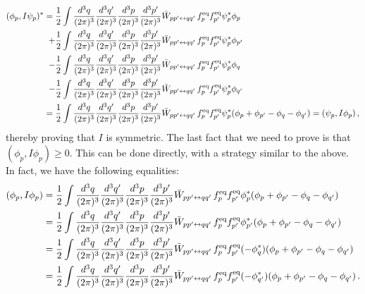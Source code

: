 \documentclass[a4paper, amsfonts, amssymb, amsmath, reprint, showkeys, nofootinbib, twoside, onecolumn,notitlepage]{revtex4-2}
\theoremstyle{definition}
\theoremstyle{theorem}
\theoremstyle{corollary}
\begin{document}
\begin{equation}\label{laquarta2}
\begin{split}
(\phi_p,I\psi_p)^*
= {}& \dfrac{1}{2} \int \dfrac{d^3 q}{(2\pi)^3} \dfrac{d^3 q'}{(2\pi)^3} \dfrac{d^3 p}{(2\pi)^3}\dfrac{d^3 p'}{(2\pi)^3}  \Bar{W}_{pp'\leftrightarrow qq'} \,  f^{\text{eq}}_{p} f^{\text{eq}}_{p'} \psi_p^* \phi_p \\
+{}& \dfrac{1}{2} \int \dfrac{d^3 q}{(2\pi)^3} \dfrac{d^3 q'}{(2\pi)^3} \dfrac{d^3 p}{(2\pi)^3}\dfrac{d^3 p'}{(2\pi)^3}  \Bar{W}_{pp'\leftrightarrow qq'} \,  f^{\text{eq}}_{p} f^{\text{eq}}_{p'} \psi_p^* \phi_{p'} \\
-{}&\dfrac{1}{2} \int \dfrac{d^3 q}{(2\pi)^3} \dfrac{d^3 q'}{(2\pi)^3} \dfrac{d^3 p}{(2\pi)^3}\dfrac{d^3 p'}{(2\pi)^3}  \Bar{W}_{pp'\leftrightarrow qq'} \,  f^{\text{eq}}_{p} f^{\text{eq}}_{p'} \psi_p^* \phi_q \\
-{}& \dfrac{1}{2} \int \dfrac{d^3 q}{(2\pi)^3} \dfrac{d^3 q'}{(2\pi)^3} \dfrac{d^3 p}{(2\pi)^3}\dfrac{d^3 p'}{(2\pi)^3}  \Bar{W}_{pp'\leftrightarrow qq'} \,  f^{\text{eq}}_{p} f^{\text{eq}}_{p'} \psi_p^* \phi_{q'}  \\
= {}& \dfrac{1}{2} \int \dfrac{d^3 q}{(2\pi)^3} \dfrac{d^3 q'}{(2\pi)^3} \dfrac{d^3 p}{(2\pi)^3}\dfrac{d^3 p'}{(2\pi)^3}  \Bar{W}_{pp'\leftrightarrow qq'} \,  f^{\text{eq}}_{p} f^{\text{eq}}_{p'} \psi_p^* (\phi_p+\phi_{p'}-\phi_q-\phi_{q'})=(\psi_p,I\phi_p) \, , \\
\end{split}
\end{equation}
thereby proving that $I$ is symmetric.
The last fact that we need to prove is that $(\phi_p,I\phi_p)\geq 0$. This can be done directly, with a strategy similar to the above. In fact, we have the following equalities:
\begin{equation}\label{finione}
\begin{split}
(\phi_p,I\phi_p) = {}& \dfrac{1}{2} \int \dfrac{d^3 q}{(2\pi)^3} \dfrac{d^3 q'}{(2\pi)^3} \dfrac{d^3 p}{(2\pi)^3}\dfrac{d^3 p'}{(2\pi)^3}  \Bar{W}_{pp'\leftrightarrow qq'} \,  f^{\text{eq}}_{p} f^{\text{eq}}_{p'} \phi_p^* (\phi_p+\phi_{p'}-\phi_q-\phi_{q'}) \\
= {}& \dfrac{1}{2} \int \dfrac{d^3 q}{(2\pi)^3} \dfrac{d^3 q'}{(2\pi)^3} \dfrac{d^3 p}{(2\pi)^3}\dfrac{d^3 p'}{(2\pi)^3}  \Bar{W}_{pp'\leftrightarrow qq'} \,  f^{\text{eq}}_{p} f^{\text{eq}}_{p'} \phi_{p'}^* (\phi_p+\phi_{p'}-\phi_q-\phi_{q'}) \\
= {}& \dfrac{1}{2} \int \dfrac{d^3 q}{(2\pi)^3} \dfrac{d^3 q'}{(2\pi)^3} \dfrac{d^3 p}{(2\pi)^3}\dfrac{d^3 p'}{(2\pi)^3}  \Bar{W}_{pp'\leftrightarrow qq'} \,  f^{\text{eq}}_{p} f^{\text{eq}}_{p'} (-\phi_q^*) (\phi_p+\phi_{p'}-\phi_q-\phi_{q'}) \\
= {}& \dfrac{1}{2} \int \dfrac{d^3 q}{(2\pi)^3} \dfrac{d^3 q'}{(2\pi)^3} \dfrac{d^3 p}{(2\pi)^3}\dfrac{d^3 p'}{(2\pi)^3}  \Bar{W}_{pp'\leftrightarrow qq'} \,  f^{\text{eq}}_{p} f^{\text{eq}}_{p'} (-\phi_{q'}^*) (\phi_p+\phi_{p'}-\phi_q-\phi_{q'}) \, . \\
\end{split}
\end{equation}
\end{document}
